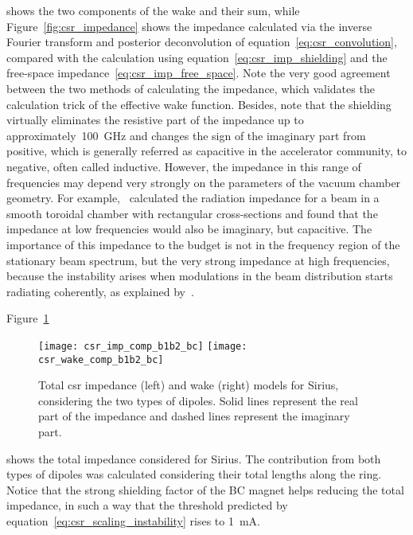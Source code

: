     shows the two components of the wake and their sum, while Figure~\ref{fig:csr_impedance} shows the impedance calculated via the inverse Fourier transform and posterior deconvolution of equation~\eqref{eq:csr_convolution}, compared with the calculation using equation~\eqref{eq:csr_imp_shielding} and the free-space impedance~\eqref{eq:csr_imp_free_space}. Note the very good agreement between the two methods of calculating the impedance, which validates the calculation trick of the effective wake function.
    Besides, note that the shielding virtually eliminates the resistive part of the impedance up to approximately~\SI{100}{\giga\hertz} and changes the sign of the imaginary part from positive, which is generally referred as capacitive in the accelerator community, to negative, often called inductive. However, the impedance in this range of frequencies may depend very strongly on the parameters of the vacuum chamber geometry. For example,~ calculated the radiation impedance for a beam in a smooth toroidal chamber with rectangular cross-sections and found that the impedance at low frequencies would also be imaginary, but capacitive. The importance of this impedance to the budget is not in the frequency region of the stationary beam spectrum, but the very strong impedance at high frequencies, because the instability arises when modulations in the beam distribution starts radiating coherently, as explained by~.

    Figure~\ref{fig:csr_total_impedance}
    \begin{figure}
        \centering
        \texttt{[image: csr\_imp\_comp\_b1b2\_bc]}\hfill
        \texttt{[image: csr\_wake\_comp\_b1b2\_bc]}
        \caption[Total CSR impedance for Sirius.]{Total \gls{csr} impedance (left) and wake (right) models for Sirius, considering the two types of dipoles. Solid lines represent the real part of the impedance and dashed lines represent the imaginary part.}
        \label{fig:csr_total_impedance}
    \end{figure}
    shows the total impedance considered for Sirius. The contribution from both types of dipoles was calculated considering their total lengths along the ring. Notice that the strong shielding factor of the BC magnet helps reducing the total impedance, in such a way that the threshold predicted by equation~\eqref{eq:csr_scaling_instability} rises to \SI{1}{\milli\ampere}.

